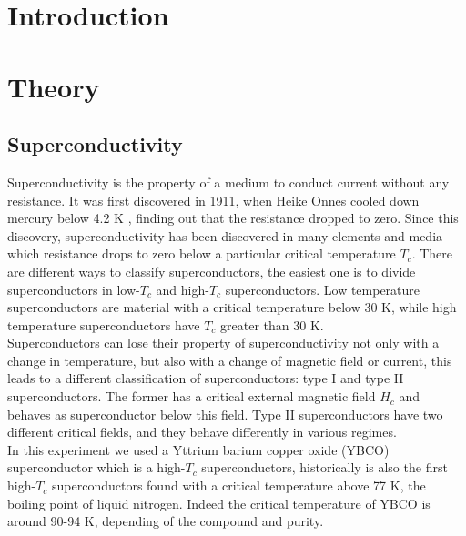 \documentclass[a4paper,10pt]{article}
\begin{document}
\begin{titlepage}
\end{titlepage}
\begin{abstract}

\end{abstract}
\section{Introduction}
\section{Theory}
\subsection{Superconductivity}
Superconductivity is the property of a medium to conduct current without any resistance. It was first discovered in 1911, when Heike Onnes cooled down mercury below 4.2 K \cite{firstsuperconductor}, finding out that the resistance dropped to zero. Since this discovery, superconductivity has been discovered in many elements and media which resistance drops to zero below a particular critical temperature $T_c$. There are different ways to classify superconductors, the easiest one is to divide superconductors in low-$T_c$ and high-$T_c$ superconductors. Low temperature superconductors are material with a critical temperature below $30$ K, while high temperature superconductors have $T_c$ greater than 30 K.\\
Superconductors can lose their property of superconductivity not only with a change in temperature, but also with a change of magnetic field or current, this leads to a different classification of superconductors: type I and type II superconductors. The former has a critical external magnetic field $H_c$ and behaves as superconductor below this field. Type II superconductors have two different critical fields, and they behave differently in various regimes.\\
In this experiment we used a Yttrium barium copper oxide (YBCO) superconductor which is a high-$T_c$ superconductors, historically is also the first high-$T_c$ superconductors found with a critical temperature above 77 K, the boiling point of liquid nitrogen. Indeed the critical temperature of YBCO is around 90-94 K, depending of the compound and purity.\\
\end{document}
